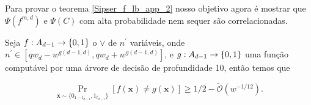 Para provar o teorema \ref{Sipser_f_lb_app_2} nosso objetivo agora é mostrar que $\Psi(f^{m, d})$ e $\Psi(C)$ com alta probabilidade nem sequer são correlacionadas.

\begin{prop} \label{depth_1_circuit_low_depth_dt_uncorrelated}

Seja $f: A_{d - 1} \to \{0, 1\}$ o $\lor$ de $n^{\prime}$ variáveis, onde $n^{\prime} \in [qw_{d} - w^{g(d - 1, d)}, qw_{d} + w^{g(d - 1, d)}]$, e $g: A_{d - 1} \to \{0, 1\}$ uma função computável por uma árvore de decisão de profundidade 10, então temos que

\begin{equation*}
	\Pr_{\boldsymbol{x} \sim \{0_{1 - t_{d - 1}}, 1_{t_{d - 1}}\}}[f(\boldsymbol{x}) \neq g(\boldsymbol{x})] \geq 1/2 - \widetilde{\mathcal{O}}(w^{-1/12}).
\end{equation*}

\end{prop}


